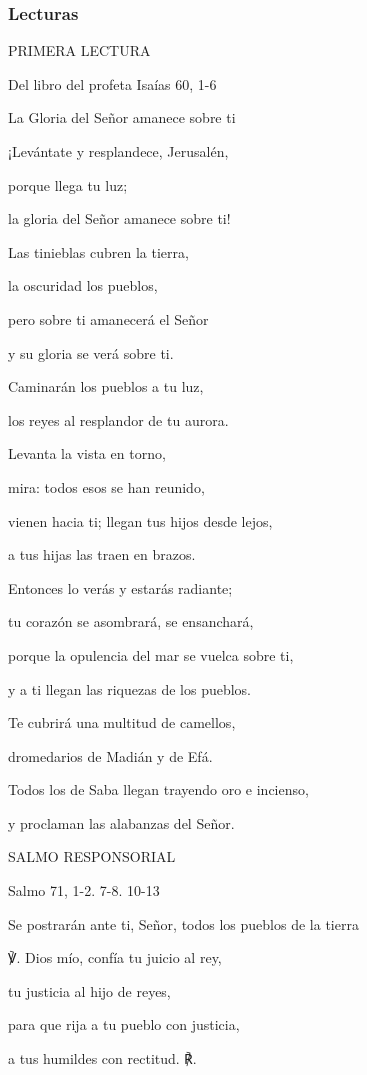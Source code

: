 \documentclass[]{article}
\begin{document}
\subsubsection{Lecturas}\label{lecturas-11}

PRIMERA LECTURA

Del libro del profeta Isaías 60, 1-6

La Gloria del Señor amanece sobre ti

¡Levántate y resplandece, Jerusalén,

porque llega tu luz;

la gloria del Señor amanece sobre ti!

Las tinieblas cubren la tierra,

la oscuridad los pueblos,

pero sobre ti amanecerá el Señor

y su gloria se verá sobre ti.

Caminarán los pueblos a tu luz,

los reyes al resplandor de tu aurora.

Levanta la vista en torno,

mira: todos esos se han reunido,

vienen hacia ti; llegan tus hijos desde lejos,

a tus hijas las traen en brazos.

Entonces lo verás y estarás radiante;

tu corazón se asombrará, se ensanchará,

porque la opulencia del mar se vuelca sobre ti,

y a ti llegan las riquezas de los pueblos.

Te cubrirá una multitud de camellos,

dromedarios de Madián y de Efá.

Todos los de Saba llegan trayendo oro e incienso,

y proclaman las alabanzas del Señor.

SALMO RESPONSORIAL

Salmo 71, 1-2. 7-8. 10-13

Se postrarán ante ti, Señor, todos los pueblos de la tierra

℣. Dios mío, confía tu juicio al rey,

tu justicia al hijo de reyes,

para que rija a tu pueblo con justicia,

a tus humildes con rectitud. ℟.
\end{document}
